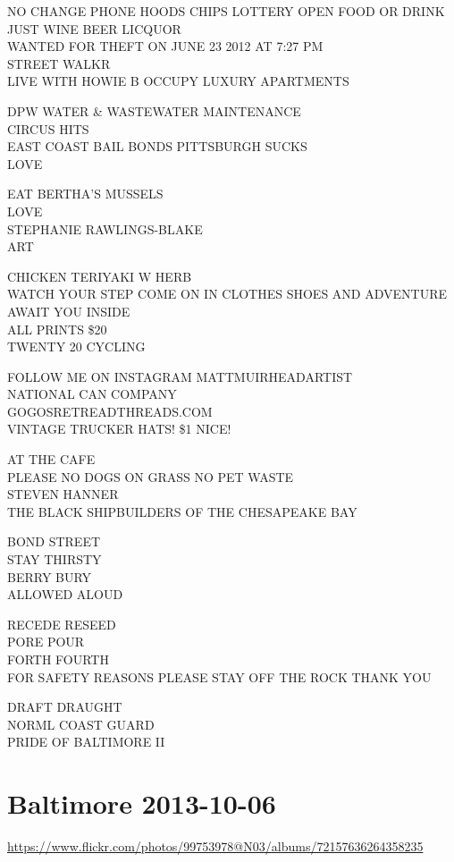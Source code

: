 \documentclass[10pt,letterpaper]{article}
\begin{document}
NO CHANGE PHONE HOODS CHIPS LOTTERY OPEN FOOD OR DRINK JUST WINE BEER LICQUOR\\
WANTED FOR THEFT ON JUNE 23 2012 AT 7:27 PM\\
STREET WALKR\\
LIVE WITH HOWIE B OCCUPY LUXURY APARTMENTS

DPW WATER \& WASTEWATER MAINTENANCE\\
CIRCUS HITS\\
EAST COAST BAIL BONDS PITTSBURGH SUCKS\\
LOVE

EAT BERTHA'S MUSSELS\\
LOVE\\
STEPHANIE RAWLINGS{-}BLAKE\\
ART

CHICKEN TERIYAKI W HERB\\
WATCH YOUR STEP COME ON IN CLOTHES SHOES AND ADVENTURE AWAIT YOU INSIDE\\
ALL PRINTS \$20\\
TWENTY 20 CYCLING

FOLLOW ME ON INSTAGRAM MATTMUIRHEADARTIST\\
NATIONAL CAN COMPANY\\
GOGOSRETREADTHREADS.COM\\
VINTAGE TRUCKER HATS! \$1 NICE!

AT THE CAFE\\
PLEASE NO DOGS ON GRASS NO PET WASTE\\
STEVEN HANNER\\
THE BLACK SHIPBUILDERS OF THE CHESAPEAKE BAY

BOND STREET\\
STAY THIRSTY\\
BERRY BURY\\
ALLOWED ALOUD

RECEDE RESEED\\
PORE POUR\\
FORTH FOURTH\\
FOR SAFETY REASONS PLEASE STAY OFF THE ROCK THANK YOU

DRAFT DRAUGHT\\
NORML COAST GUARD\\
PRIDE OF BALTIMORE II


\section*{Baltimore 2013-10-06}

\url{https://www.flickr.com/photos/99753978@N03/albums/72157636264358235}
\end{document}
